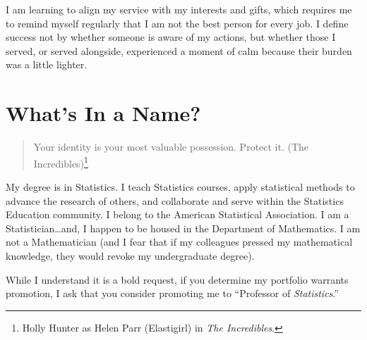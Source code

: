 \documentclass[
  letterpaper,
  DIV=11,
  numbers=noendperiod]{scrreprt}
\begin{document}
\begin{tcolorbox}[enhanced jigsaw, breakable, colframe=quarto-callout-tip-color-frame, title=\textcolor{quarto-callout-tip-color}{\faLightbulb}\hspace{0.5em}{Operating in Places that Complement My Interests and Gifts}, coltitle=black, rightrule=.15mm, opacityback=0, leftrule=.75mm, toprule=.15mm, toptitle=1mm, arc=.35mm, bottomrule=.15mm, bottomtitle=1mm, titlerule=0mm, opacitybacktitle=0.6, left=2mm, colback=white, colbacktitle=quarto-callout-tip-color!10!white]

I am learning to align my service with my interests and gifts, which
requires me to remind myself regularly that I am not the best person for
every job. I define success not by whether someone is aware of my
actions, but whether those I served, or served alongside, experienced a
moment of calm because their burden was a little lighter.

\end{tcolorbox}


\chapter{What's In a Name?}\label{whats-in-a-name}

\begin{quote}
Your identity is your most valuable possession. Protect it. (The
Incredibles)\footnote{Holly Hunter as Helen Parr (Elastigirl) in
  \emph{The Incredibles}.}
\end{quote}

My degree is in Statistics. I teach Statistics courses, apply
statistical methods to advance the research of others, and collaborate
and serve within the Statistics Education community. I belong to the
American Statistical Association. I am a Statistician\ldots and, I
happen to be housed in the Department of Mathematics. I am not a
Mathematician (and I fear that if my colleagues pressed my mathematical
knowledge, they would revoke my undergraduate degree).

While I understand it is a bold request, if you determine my portfolio
warrants promotion, I ask that you consider promoting me to ``Professor
of \emph{Statistics}.''
\end{document}
